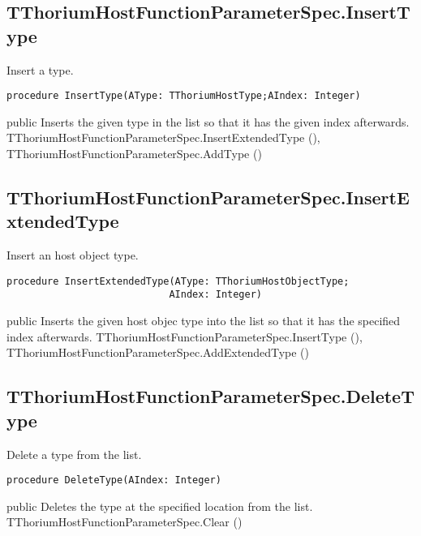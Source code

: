 \subsection{TThoriumHostFunctionParameterSpec.InsertType}
\label{thoriumcorepkg:thorium:tthoriumhostfunctionparameterspec:inserttype}
\begin{FPCList}
\Synopsis
Insert a type.\Declaration 

\begin{verbatim}
procedure InsertType(AType: TThoriumHostType;AIndex: Integer)
\end{verbatim}
\Visibility
public
\Description
Inserts the given type in the list so that it has the given index afterwards.\SeeAlso
TThoriumHostFunctionParameterSpec.InsertExtendedType (\pageref{thoriumcorepkg:thorium:tthoriumhostfunctionparameterspec:insertextendedtype}),
TThoriumHostFunctionParameterSpec.AddType (\pageref{thoriumcorepkg:thorium:tthoriumhostfunctionparameterspec:addtype})\end{FPCList}
\subsection{TThoriumHostFunctionParameterSpec.InsertExtendedType}
\label{thoriumcorepkg:thorium:tthoriumhostfunctionparameterspec:insertextendedtype}
\begin{FPCList}
\Synopsis
Insert an host object type.\Declaration 

\begin{verbatim}
procedure InsertExtendedType(AType: TThoriumHostObjectType;
                            AIndex: Integer)
\end{verbatim}
\Visibility
public
\Description
Inserts the given host objec type into the list so that it has the specified index afterwards.\SeeAlso
TThoriumHostFunctionParameterSpec.InsertType (\pageref{thoriumcorepkg:thorium:tthoriumhostfunctionparameterspec:inserttype}),
TThoriumHostFunctionParameterSpec.AddExtendedType (\pageref{thoriumcorepkg:thorium:tthoriumhostfunctionparameterspec:addextendedtype})\end{FPCList}
\subsection{TThoriumHostFunctionParameterSpec.DeleteType}
\label{thoriumcorepkg:thorium:tthoriumhostfunctionparameterspec:deletetype}
\begin{FPCList}
\Synopsis
Delete a type from the list.\Declaration 

\begin{verbatim}
procedure DeleteType(AIndex: Integer)
\end{verbatim}
\Visibility
public
\Description
Deletes the type at the specified location from the list.\SeeAlso
TThoriumHostFunctionParameterSpec.Clear (\pageref{thoriumcorepkg:thorium:tthoriumhostfunctionparameterspec:clear})\end{FPCList}
